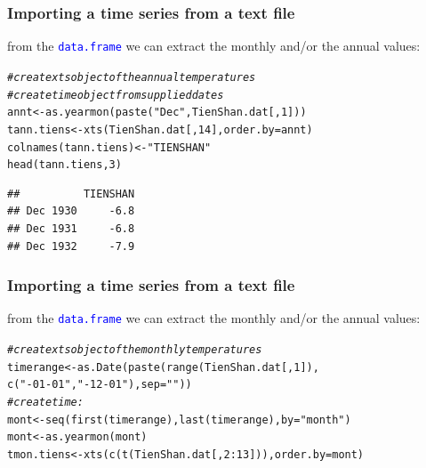 \documentclass[xcolor=table, xcolor=dvipsnames]{beamer}\usepackage[]{graphicx}\usepackage[]{color}
\makeatletter
\newcommand{\hlnum}[1]{\textcolor[rgb]{0,0,0}{#1}}
\newcommand{\hlstr}[1]{\textcolor[rgb]{0.545,0.137,0.137}{#1}}
\newcommand{\hlcom}[1]{\textcolor[rgb]{0,0.392,0}{\textit{#1}}}
\newcommand{\hlopt}[1]{\textcolor[rgb]{0,0,0}{#1}}
\newcommand{\hlstd}[1]{\textcolor[rgb]{0,0,0}{#1}}
\newcommand{\hlkwb}[1]{\textcolor[rgb]{0,0,0}{#1}}
\newcommand{\hlkwc}[1]{\textcolor[rgb]{1,0,1}{#1}}
\newcommand{\hlkwd}[1]{\textcolor[rgb]{0,0,1}{#1}}
\newenvironment{kframe}{%
 \def\at@end@of@kframe{}%
 \ifinner\ifhmode%
  \def\at@end@of@kframe{\end{minipage}}%
  \begin{minipage}{\columnwidth}%
 \fi\fi%
 \def\FrameCommand##1{\hskip\@totalleftmargin \hskip-\fboxsep
 \colorbox{shadecolor}{##1}\hskip-\fboxsep
     \hskip-\linewidth \hskip-\@totalleftmargin \hskip\columnwidth}%
 \MakeFramed {\advance\hsize-\width
   \@totalleftmargin\z@ \linewidth\hsize
   \@setminipage}}%
 {\par\unskip\endMakeFramed%
 \at@end@of@kframe}
\newenvironment{knitrout}{}{} %
\newcommand{\rcode}[1]{\texttt{\textcolor{Blue}{#1}}} %
\makeatother
\begin{document}
\begin{frame}[fragile]\frametitle{Importing a time series from a text file}
from the \rcode{data.frame} we can extract the monthly and/or the annual values:
\begin{knitrout}
\color{fgcolor}\begin{kframe}
\begin{alltt}
\hlcom{# create xts object of the annual temperatures}
\hlcom{# create time object from supplied dates}
\hlstd{annt} \hlkwb{<-} \hlkwd{as.yearmon}\hlstd{(}\hlkwd{paste}\hlstd{(}\hlstr{"Dec"}\hlstd{, TienShan.dat[,}\hlnum{1}\hlstd{]))}
\hlstd{tann.tiens} \hlkwb{<-} \hlkwd{xts}\hlstd{(TienShan.dat[,}\hlnum{14}\hlstd{],} \hlkwc{order.by}\hlstd{=annt)}
\hlkwd{colnames}\hlstd{(tann.tiens)} \hlkwb{<-} \hlstr{"TIENSHAN"}
\hlkwd{head}\hlstd{(tann.tiens,}\hlnum{3}\hlstd{)}
\end{alltt}
\begin{verbatim}
##          TIENSHAN
## Dec 1930     -6.8
## Dec 1931     -6.8
## Dec 1932     -7.9
\end{verbatim}
\end{kframe}
\end{knitrout}
\end{frame}


\begin{frame}[fragile]\frametitle{Importing a time series from a text file}
from the \rcode{data.frame} we can extract the monthly and/or the annual values:
\begin{knitrout}
\color{fgcolor}\begin{kframe}
\begin{alltt}
\hlcom{# create xts object of the monthly temperatures}
\hlstd{timerange} \hlkwb{<-} \hlkwd{as.Date}\hlstd{(}\hlkwd{paste}\hlstd{(}\hlkwd{range}\hlstd{(TienShan.dat[,}\hlnum{1}\hlstd{]),}
                           \hlkwd{c}\hlstd{(}\hlstr{"-01-01"}\hlstd{,} \hlstr{"-12-01"}\hlstd{),} \hlkwc{sep}\hlstd{=}\hlstr{""}\hlstd{))}
\hlcom{# create time:}
\hlstd{mont} \hlkwb{<-} \hlkwd{seq}\hlstd{(}\hlkwd{first}\hlstd{(timerange),} \hlkwd{last}\hlstd{(timerange),} \hlkwc{by}\hlstd{=}\hlstr{"month"}\hlstd{)}
\hlstd{mont} \hlkwb{<-} \hlkwd{as.yearmon}\hlstd{(mont)}
\hlstd{tmon.tiens} \hlkwb{<-} \hlkwd{xts}\hlstd{(}\hlkwd{c}\hlstd{(}\hlkwd{t}\hlstd{(TienShan.dat[,}\hlnum{2}\hlopt{:}\hlnum{13}\hlstd{])),} \hlkwc{order.by}\hlstd{=mont)}
\end{alltt}
\end{kframe}
\end{knitrout}
\end{frame}
\end{document}
